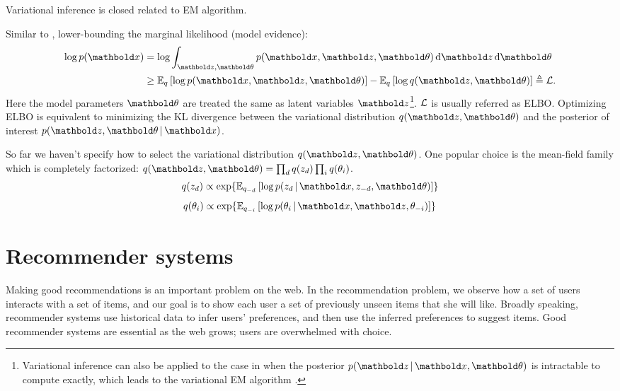 \PP Variational inference is closed related to \gls{EM} algorithm. 

\PP Similar to , lower-bounding the marginal likelihood (model evidence):
\begin{equation}
\begin{split}
\log p(\mbx) &= \log\int_{\mbz, \mb\theta} p(\mbx, \mbz, \mb\theta) \dif{\mbz} \dif\mb\theta \\
&\geq \EE{q}{\log p(\mbx, \mbz, \mb\theta)} - \EE{q}{\log q(\mbz, \mb\theta)}\triangleq \cL.
\end{split}
\label{chpt:background:eq:vi}
\end{equation}
Here the model parameters $\mb\theta$ are treated the same as latent variables $\mbz$\footnote{Variational inference can also be applied to the case in  when the posterior $p(\mbz \g \mbx, \mb\theta)$ is intractable to compute exactly, which leads to the variational \gls{EM} algorithm \citep{beal2003variational}.}. $\mathcal{L}$ is usually referred as \gls{ELBO}. Optimizing \gls{ELBO} is equivalent to minimizing the \gls{KL} divergence between the variational distribution $q(\mbz, \mb\theta)$ and the posterior of interest $p(\mbz, \mb\theta \g \mbx)$.

So far we haven't specify how to select the variational distribution $q(\mbz, \mb\theta)$. One popular choice is the mean-field family which is completely factorized: $q(\mbz, \mb\theta) = \prod_{d} q(z_{d}) \prod_i q(\theta_i)$.
\begin{equation*}
q(z_d) \propto \exp\{\EE{q_{-d}}{\log p(z_d \g \mbx, z_{-d}, \mb\theta)}\}
\end{equation*}
\begin{equation*}
q(\theta_i) \propto \exp\{\EE{q_{-i}}{\log p(\theta_i \g \mbx, \mbz, \theta_{-i})}\}
\end{equation*}

\section{Recommender systems}\label{chpt:background:sec:recsys}

Making good recommendations is an important problem on the web. In the
recommendation problem, we observe how a set of users interacts with a
set of items, and our goal is to show each user a set of previously
unseen items that she will like.  Broadly speaking, recommender
systems use historical data to infer users' preferences, and then use
the inferred preferences to suggest items.  Good recommender
systems are essential as the web grows; users are overwhelmed with
choice.

